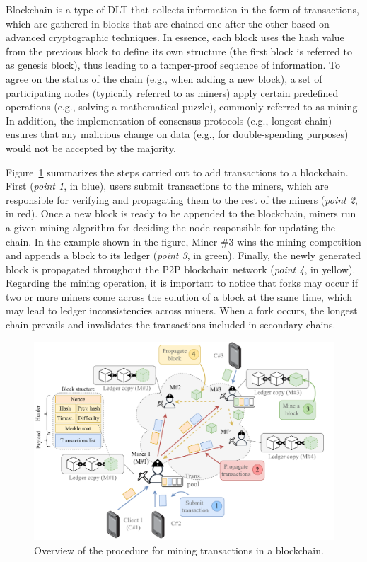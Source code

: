 \documentclass[lettersize,journal]{IEEEtran}
\begin{document}
Blockchain is a type of DLT that collects information in the form of transactions, which are gathered in blocks that are chained one after the other based on advanced cryptographic techniques. In essence, each block uses the hash value from the previous block to define its own structure (the first block is referred to as genesis block), thus leading to a tamper-proof sequence of information. To agree on the status of the chain (e.g., when adding a new block), a set of participating nodes (typically referred to as miners) apply certain predefined operations (e.g., solving a mathematical puzzle), commonly referred to as mining. In addition, the implementation of consensus protocols (e.g., longest chain) ensures that any malicious change on data (e.g., for double-spending purposes) would not be accepted by the majority.

Figure~\ref{fig:blockchain_summary} summarizes the steps carried out to add transactions to a blockchain. First (\textit{point 1}, in blue), users submit transactions to the miners, which are responsible for verifying and propagating them to the rest of the miners (\textit{point 2}, in red). Once a new block is ready to be appended to the blockchain, miners run a given mining algorithm for deciding the node responsible for updating the chain. In the example shown in the figure, Miner \#3 wins the mining competition and appends a block to its ledger (\textit{point 3}, in green). Finally, the newly generated block is propagated throughout the P2P blockchain network (\textit{point 4}, in yellow). Regarding the mining operation, it is important to notice that forks may occur if two or more miners come across the solution of a block at the same time, which may lead to ledger inconsistencies across miners. When a fork occurs, the longest chain prevails and invalidates the transactions included in secondary chains.

\begin{figure}[ht!]
	\centering
	\includegraphics[width=\linewidth]{img/blockchain_summary_new.pdf}
	\caption{Overview of the procedure for mining transactions in a blockchain.}
	\label{fig:blockchain_summary}
\end{figure}
\end{document}
